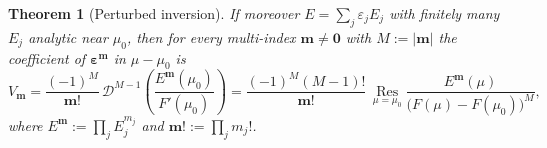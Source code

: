 \documentclass[11pt,a4paper,oneside]{book}
\theoremstyle{plain}
\newtheorem{theorem}{Theorem}[chapter]
\theoremstyle{definition}
\theoremstyle{remark}
\begin{document}
\begin{theorem}[Perturbed inversion]
If moreover $E=\sum_{j}\varepsilon_{j}E_{j}$ with finitely many $E_{j}$
analytic near $\mu_{0}$, then for every multi-index $\boldsymbol m\ne\boldsymbol0$
with $M:=|\boldsymbol m|$ the coefficient of
$\boldsymbol\varepsilon^{\boldsymbol m}$ in $\mu-\mu_{0}$ is
\begin{equation}\label{p0:eq:perturbed-multi}
 V_{\boldsymbol m}
 =\frac{(-1)^{M}}{\boldsymbol m!}\,
  \mathcal{D}^{M-1}\!\left(\frac{E^{\boldsymbol m}(\mu_{0})}{F'(\mu_{0})}\right)
 =\frac{(-1)^{M}(M-1)!}{\boldsymbol m!}\,
  \operatorname*{Res}_{\mu=\mu_{0}}
  \frac{E^{\boldsymbol m}(\mu)}{\bigl(F(\mu)-F(\mu_{0})\bigr)^{M}},
\end{equation}
where $E^{\boldsymbol m}:=\prod_{j}E_{j}^{m_{j}}$ and
$\boldsymbol m!:=\prod_{j}m_{j}!$.
\end{theorem}
\end{document}

